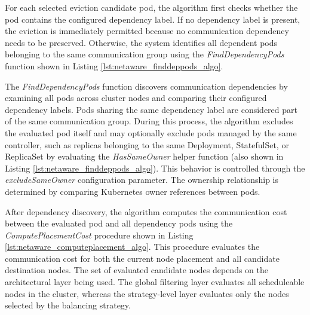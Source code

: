 For each selected eviction candidate pod, the algorithm first checks whether the pod contains the configured dependency label. If no dependency label is present, the eviction is immediately permitted because no communication dependency needs to be preserved. Otherwise, the system identifies all dependent pods belonging to the same communication group using the \textit{FindDependencyPods} function shown in Listing \ref{lst:netaware_finddeppods_algo}.

\noindent\begin{minipage}{\linewidth}

\end{minipage}

The \textit{FindDependencyPods} function discovers communication dependencies by examining all pods across cluster nodes and comparing their configured dependency labels. Pods sharing the same dependency label are considered part of the same communication group. During this process, the algorithm excludes the evaluated pod itself and may optionally exclude pods managed by the same controller, such as replicas belonging to the same Deployment, StatefulSet, or ReplicaSet by evaluating the \textit{HasSameOwner} helper function (also shown in Listing \ref{lst:netaware_finddeppods_algo}). This behavior is controlled through the \textit{excludeSameOwner} configuration parameter. The ownership relationship is determined by comparing Kubernetes owner references between pods.

After dependency discovery, the algorithm computes the communication cost between the evaluated pod and all dependency pods using the \textit{ComputePlacementCost} procedure shown in Listing \ref{lst:netaware_computeplacement_algo}. This procedure evaluates the communication cost for both the current node placement and all candidate destination nodes. The set of evaluated candidate nodes depends on the architectural layer being used. The global filtering layer evaluates all scheduleable nodes in the cluster, whereas the strategy-level layer evaluates only the nodes selected by the balancing strategy.

\noindent\begin{minipage}{\linewidth}

\end{minipage}

